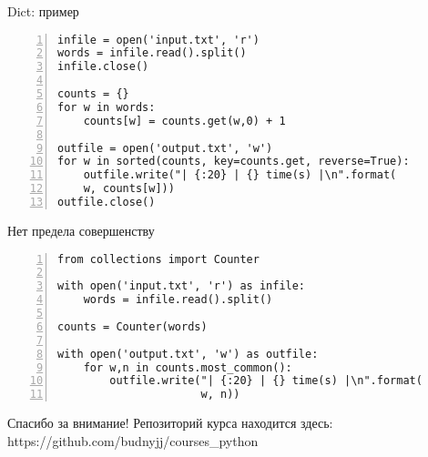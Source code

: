 \documentclass[hyperref={pdftex,unicode}]{beamer}
\begin{document}
\begin{frame}[fragile]{Dict: пример}
\begin{lstlisting}[basicstyle=\footnotesize\ttfamily,numbers=left]
infile = open('input.txt', 'r')
words = infile.read().split()
infile.close()

counts = {}
for w in words:
    counts[w] = counts.get(w,0) + 1

outfile = open('output.txt', 'w')
for w in sorted(counts, key=counts.get, reverse=True):
    outfile.write("| {:20} | {} time(s) |\n".format(
    w, counts[w]))
outfile.close()
\end{lstlisting}
\end{frame}

\begin{frame}[fragile]{Нет предела совершенству}
\begin{lstlisting}[basicstyle=\footnotesize\ttfamily,numbers=left]
from collections import Counter

with open('input.txt', 'r') as infile:
    words = infile.read().split()

counts = Counter(words)

with open('output.txt', 'w') as outfile:
    for w,n in counts.most_common():
        outfile.write("| {:20} | {} time(s) |\n".format(
                      w, n))
\end{lstlisting}
\end{frame}

\begin{frame}{Спасибо за внимание!}
  Репозиторий курса находится здесь: \\
  https://github.com/budnyjj/courses\_python
\end{frame}
\end{document}
